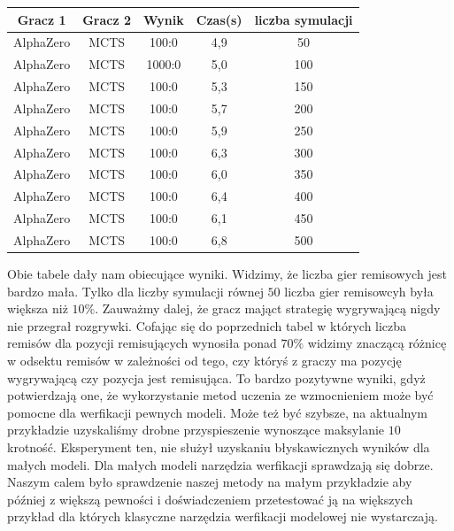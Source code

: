         \begin{longtable}{|c|c|c|c|c|}
          \hline
          \textbf{Gracz 1} & \textbf{Gracz 2} & \textbf{Wynik} & \textbf{Czas(s)} & \textbf{liczba symulacji} \\ \hline
          AlphaZero & MCTS & 100:0 & 4,9 & 50 \\ \hline
          AlphaZero & MCTS & 1000:0 & 5,0 & 100 \\ \hline
          AlphaZero & MCTS & 100:0 & 5,3 & 150 \\ \hline
          AlphaZero & MCTS & 100:0 & 5,7 & 200 \\ \hline
          AlphaZero & MCTS & 100:0 & 5,9 & 250 \\ \hline
          AlphaZero & MCTS & 100:0 & 6,3 & 300 \\ \hline
          AlphaZero & MCTS & 100:0 & 6,0 & 350 \\ \hline
          AlphaZero & MCTS & 100:0 & 6,4 & 400 \\ \hline
          AlphaZero & MCTS & 100:0 & 6,1 & 450 \\ \hline
          AlphaZero & MCTS & 100:0 & 6,8 & 500 \\ \hline
          \end{longtable}
    Obie tabele dały nam obiecujące wyniki. Widzimy, że liczba gier remisowych 
    jest bardzo mała. Tylko dla liczby symulacji równej $50$ liczba gier remisowcyh 
    była większa niż $10 \%$. Zauważmy dalej, że gracz mająct strategię wygrywającą 
    nigdy nie przegrał rozgrywki. Cofając się do poprzednich tabel w których 
    liczba remisów dla pozycji remisujących wynosiła ponad $70 \%$ widzimy znaczącą 
    różnicę w odsektu remisów w zależności od tego, czy któryś z graczy 
    ma pozycję wygrywającą czy pozycja jest remisująca. To bardzo pozytywne wyniki,
    gdyż potwierdzają one, że wykorzystanie metod uczenia ze wzmocnieniem 
    może być pomocne dla werfikacji pewnych modeli. Może też być szybsze, 
    na aktualnym przykładzie uzyskaliśmy drobne przyspieszenie wynoszące maksylanie 
    $10$ krotność. Eksperyment ten, nie służył uzyskaniu błyskawicznych wyników 
    dla małych modeli. Dla małych modeli narzędzia werfikacji sprawdzają się dobrze.
    Naszym calem było sprawdzenie naszej metody na małym przykładzie aby później 
    z większą pewności i doświadczeniem przetestować ją na większych przykład 
    dla których klasyczne narzędzia werfikacji modelowej nie wystarczają.
          
